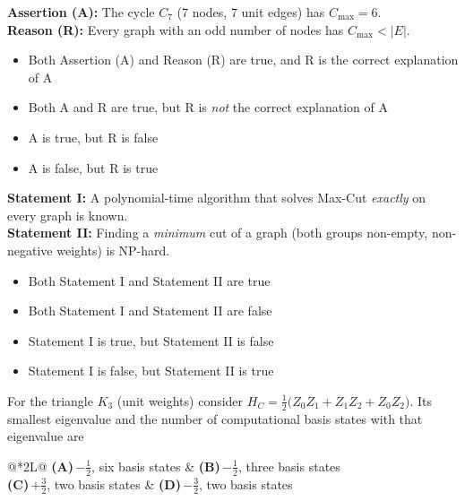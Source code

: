 \documentclass[11pt,a4paper]{article}
\newcommand{\optlabel}[1]{\textbf{(#1)}}
\newenvironment{qitem}[1]{\begin{list}{}{\setlength{\leftmargin}{3.3em}\setlength{\labelwidth}{3.1em}%
  \setlength{\labelsep}{0.2em}\setlength{\topsep}{3pt}\setlength{\parsep}{3pt}}\item[\textbf{Q.#1}\hfill]}{\end{list}}
\newcommand{\qsep}{\par\vspace{2pt}{\color{black!15}\hrule}\vspace{4pt}}
\begin{document}
\begin{qitem}{7}
\textbf{Assertion (A):} The cycle $C_7$ (7 nodes, 7 unit edges) has $C_{\max} = 6$.\\[1mm]
\textbf{Reason (R):} Every graph with an odd number of nodes has $C_{\max} < |E|$.
\begin{itemize}[leftmargin=2.6em, labelsep=0.4em, itemsep=2pt, topsep=3pt]
\item[\optlabel{A}] Both Assertion (A) and Reason (R) are true, and R is the correct explanation of A
\item[\optlabel{B}] Both A and R are true, but R is \emph{not} the correct explanation of A
\item[\optlabel{C}] A is true, but R is false
\item[\optlabel{D}] A is false, but R is true
\end{itemize}
\end{qitem}
\qsep

\begin{qitem}{8}
\textbf{Statement I:} A polynomial-time algorithm that solves Max-Cut \emph{exactly} on every graph is known.\\[1mm]
\textbf{Statement II:} Finding a \emph{minimum} cut of a graph (both groups non-empty, non-negative weights) is NP-hard.
\begin{itemize}[leftmargin=2.6em, labelsep=0.4em, itemsep=2pt, topsep=3pt]
\item[\optlabel{A}] Both Statement I and Statement II are true
\item[\optlabel{B}] Both Statement I and Statement II are false
\item[\optlabel{C}] Statement I is true, but Statement II is false
\item[\optlabel{D}] Statement I is false, but Statement II is true
\end{itemize}
\end{qitem}
\qsep

\begin{qitem}{9}
For the triangle $K_3$ (unit weights) consider $H_C = \tfrac12\big(Z_0Z_1 + Z_1Z_2 + Z_0Z_2\big)$. Its smallest eigenvalue
and the number of computational basis states with that eigenvalue are
\par\smallskip\noindent\begin{tabularx}{\linewidth}{@{}*{2}{L}@{}}
\optlabel{A}\,$-\tfrac12$, six basis states & \optlabel{B}\,$-\tfrac12$, three basis states \\[3pt]
\optlabel{C}\,$+\tfrac32$, two basis states & \optlabel{D}\,$-\tfrac32$, two basis states
\end{tabularx}
\end{qitem}
\qsep
\end{document}
